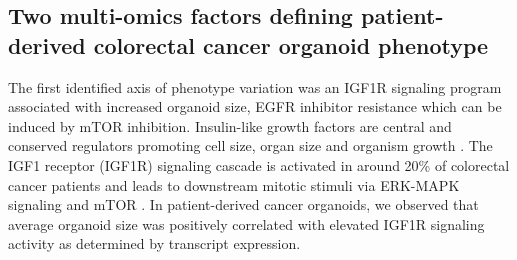 \begin{flushleft}
\subsection{Two multi-omics factors defining patient-derived colorectal cancer organoid phenotype}

The first identified axis of phenotype variation was an IGF1R signaling program associated with increased organoid size, EGFR inhibitor resistance which can be induced by mTOR inhibition. Insulin-like growth factors are central and conserved regulators promoting cell size, organ size and organism growth \parencite{pucheHumanConditionsInsulinlike2012, sunMechanismCellSize2006}. The IGF1 receptor (IGF1R) signaling cascade is activated in around 20\% of colorectal cancer patients and leads to downstream mitotic stimuli via ERK-MAPK signaling and mTOR \parencite{zhongOverproductionIGF2Drives201}. In patient-derived cancer organoids, we observed that average organoid size was positively correlated with elevated IGF1R signaling activity as determined by transcript expression.
\par


\end{flushleft}

